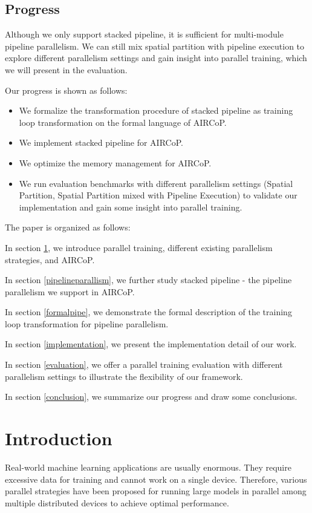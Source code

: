 \documentclass[sigplan, nonacm]{acmart}\settopmatter{printfolios=true,printccs=false,printacmref=false}
\begin{document}
\subsection{Progress}
Although we only support stacked pipeline, it is sufficient for multi-module pipeline parallelism. We can still mix spatial partition with pipeline execution to explore different parallelism settings and gain insight into parallel training, which we will present in the evaluation.\par
Our progress is shown as follows:
\begin{itemize}
  \item We formalize the transformation procedure of stacked pipeline as training loop transformation on the formal language of AIRCoP.
  \item We implement stacked pipeline for AIRCoP.
  \item We optimize the memory management for AIRCoP.
  \item We run evaluation benchmarks with different parallelism settings (Spatial Partition, Spatial Partition mixed with Pipeline Execution) to validate our implementation and gain some insight into parallel training.
\end{itemize}
The paper is organized as follows: \par \par
In section \ref{introduction}, we introduce parallel training, different existing parallelism strategies, and AIRCoP.\par
In section \ref{pipelineparallism}, we further study stacked pipeline - the pipeline parallelism we support in AIRCoP.\par
In section \ref{formalpipe}, we demonstrate the formal description of the training loop transformation for pipeline parallelism.\par
In section \ref{implementation}, we present the implementation detail of our work.\par
In section \ref{evaluation}, we offer a parallel training evaluation with different parallelism settings to illustrate the flexibility of our framework.\par
In section \ref{conclusion}, we summarize our progress and draw some conclusions.
\section{Introduction} \label{introduction}
Real-world machine learning applications are usually enormous. They require excessive data for training and cannot work on a single device. Therefore, various parallel strategies have been proposed for running large models in parallel among multiple distributed devices to achieve optimal performance.\par
\end{document}
